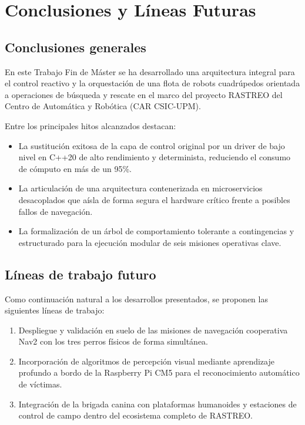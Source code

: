 \chapter{Conclusiones y Líneas Futuras}
\label{chap:conclusiones}

\section{Conclusiones generales}
\label{sec:conclusiones_gen}

En este Trabajo Fin de Máster se ha desarrollado una arquitectura integral para el control reactivo y la orquestación de una flota de robots cuadrúpedos orientada a operaciones de búsqueda y rescate en el marco del proyecto RASTREO del Centro de Automática y Robótica (CAR CSIC-UPM).

Entre los principales hitos alcanzados destacan:
\begin{itemize}
    \item La sustitución exitosa de la capa de control original por un driver de bajo nivel en C++20 de alto rendimiento y determinista, reduciendo el consumo de cómputo en más de un 95\%.
    \item La articulación de una arquitectura contenerizada en microservicios desacoplados que aísla de forma segura el hardware crítico frente a posibles fallos de navegación.
    \item La formalización de un árbol de comportamiento tolerante a contingencias y estructurado para la ejecución modular de seis misiones operativas clave.
\end{itemize}

\section{Líneas de trabajo futuro}
\label{sec:lineas_futuras}

Como continuación natural a los desarrollos presentados, se proponen las siguientes líneas de trabajo:
\begin{enumerate}
    \item Despliegue y validación en suelo de las misiones de navegación cooperativa Nav2 con los tres perros físicos de forma simultánea.
    \item Incorporación de algoritmos de percepción visual mediante aprendizaje profundo a bordo de la Raspberry Pi CM5 para el reconocimiento automático de víctimas.
    \item Integración de la brigada canina con plataformas humanoides y estaciones de control de campo dentro del ecosistema completo de RASTREO.
\end{enumerate}

